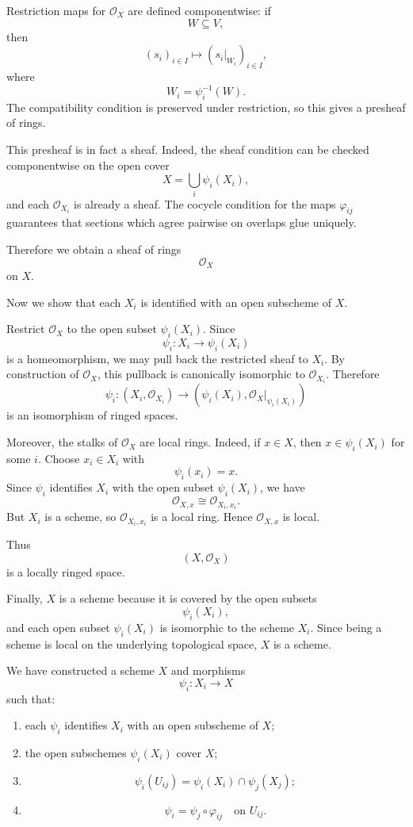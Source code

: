 \documentclass[12pt,a4paper]{article}
\theoremstyle{notespace}
\begin{document}
Restriction maps for \(\mathcal O_X\) are defined componentwise:
if
\[
W\subseteq V,
\]
then
\[
(s_i)_{i\in I}
\longmapsto
(s_i|_{W_i})_{i\in I},
\]
where
\[
W_i=\psi_i^{-1}(W).
\]
The compatibility condition is preserved under restriction, so this gives a presheaf of rings.

This presheaf is in fact a sheaf. Indeed, the sheaf condition can be checked componentwise on the open cover
\[
X=\bigcup_i \psi_i(X_i),
\]
and each \(\mathcal O_{X_i}\) is already a sheaf. The cocycle condition for the maps \(\varphi_{ij}\) guarantees that sections which agree pairwise on overlaps glue uniquely.

Therefore we obtain a sheaf of rings
\[
\mathcal O_X
\]
on \(X\).

Now we show that each \(X_i\) is identified with an open subscheme of \(X\).

Restrict \(\mathcal O_X\) to the open subset \(\psi_i(X_i)\). Since
\[
\psi_i:X_i\to \psi_i(X_i)
\]
is a homeomorphism, we may pull back the restricted sheaf to \(X_i\). By construction of \(\mathcal O_X\), this pullback is canonically isomorphic to \(\mathcal O_{X_i}\). Therefore
\[
\psi_i:
(X_i,\mathcal O_{X_i})
\longrightarrow
(\psi_i(X_i),\mathcal O_X|_{\psi_i(X_i)})
\]
is an isomorphism of ringed spaces.

Moreover, the stalks of \(\mathcal O_X\) are local rings. Indeed, if \(x\in X\), then \(x\in \psi_i(X_i)\) for some \(i\). Choose \(x_i\in X_i\) with
\[
\psi_i(x_i)=x.
\]
Since \(\psi_i\) identifies \(X_i\) with the open subset \(\psi_i(X_i)\), we have
\[
\mathcal O_{X,x}\cong \mathcal O_{X_i,x_i}.
\]
But \(X_i\) is a scheme, so \(\mathcal O_{X_i,x_i}\) is a local ring. Hence \(\mathcal O_{X,x}\) is local.

Thus
\[
(X,\mathcal O_X)
\]
is a locally ringed space.

Finally, \(X\) is a scheme because it is covered by the open subsets
\[
\psi_i(X_i),
\]
and each open subset \(\psi_i(X_i)\) is isomorphic to the scheme \(X_i\). Since being a scheme is local on the underlying topological space, \(X\) is a scheme.

We have constructed a scheme \(X\) and morphisms
\[
\psi_i:X_i\to X
\]
such that:

\begin{enumerate}[label=\textup{(\arabic*)}]
	\item each \(\psi_i\) identifies \(X_i\) with an open subscheme of \(X\);
	
	\item the open subschemes \(\psi_i(X_i)\) cover \(X\);
	
	\item
	\[
	\psi_i(U_{ij})
	=
	\psi_i(X_i)\cap \psi_j(X_j);
	\]
	
	\item
	\[
	\psi_i
	=
	\psi_j\circ \varphi_{ij}
	\quad\text{on }U_{ij}.
	\]
\end{enumerate}
\end{document}
